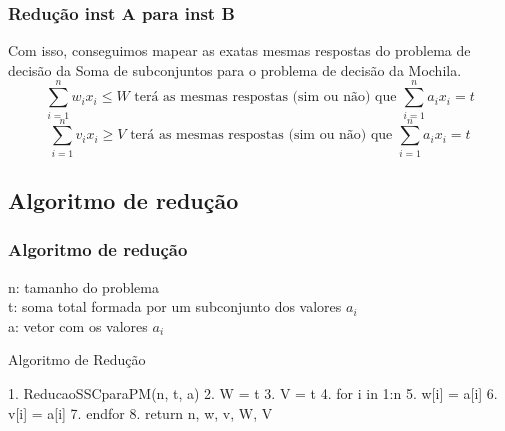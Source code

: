 \documentclass{beamer}
\begin{document}
\begin{frame}
    \frametitle{Redução inst A para inst B}
        Com isso, conseguimos mapear as exatas mesmas respostas do problema de decisão da Soma de subconjuntos para o problema de decisão da Mochila.
         \begin{equation*}
            \sum_{i=1}^{n} w_{i} x_{i} \leq W \mbox{ terá as mesmas respostas (sim ou não) que } \sum_{i=1}^{n} a_{i} x_{i} = t
         \end{equation*}
         \begin{equation*}
            \sum_{i=1}^{n} v_{i} x_{i} \geq V \mbox{ terá as mesmas respostas (sim ou não) que } \sum_{i=1}^{n} a_{i} x_{i} = t
         \end{equation*}
\end{frame}

\subsection{Algoritmo de redução}
\begin{frame}[fragile]
\frametitle{Algoritmo de redução}
    n: tamanho do problema \\
    t: soma total formada por um subconjunto dos valores $a_{i}$ \\
    a: vetor com os valores $a_{i}$ \\
    \begin{block}{Algoritmo de Redução}
        \begin{semiverbatim}
        1. ReducaoSSCparaPM(n, t, a)
        2.    W = t
        3.    V = t
        4.    for i in 1:n
        5.        w[i] = a[i]
        6.        v[i] = a[i]
        7.    endfor
        8.    return n, w, v, W, V
        \end{semiverbatim}
    \end{block}
\end{frame}

\end{document}
